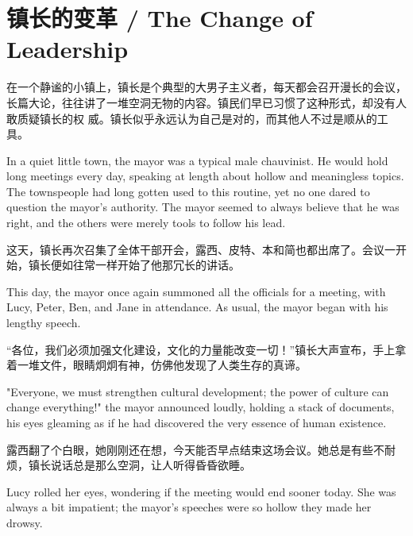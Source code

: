 \chapter*{镇长的变革 / The Change of Leadership}

在一个静谧的小镇上，镇长是个典型的大男子主义者，每天都会召开漫长的会议，长篇大论，往往讲了一堆空洞无物的内容。镇民们早已习惯了这种形式，却没有人敢质疑镇长的权
威。镇长似乎永远认为自己是对的，而其他人不过是顺从的工具。

\begin{flushright} In a quiet little town, the mayor was a typical male
    chauvinist. He would hold long meetings every day, speaking at length about
    hollow and meaningless topics. The townspeople had long gotten used to this
    routine, yet no one dared to question the mayor's authority. The mayor
    seemed
    to always believe that he was right, and the others were merely tools to
    follow
    his lead. \end{flushright}

这天，镇长再次召集了全体干部开会，露西、皮特、本和简也都出席了。会议一开始，镇长便如往常一样开始了他那冗长的讲话。

\begin{flushright} This day, the mayor once again summoned all the officials
    for a meeting, with Lucy, Peter, Ben, and Jane in attendance. As usual, the
    mayor began with his lengthy speech. \end{flushright}

“各位，我们必须加强文化建设，文化的力量能改变一切！”镇长大声宣布，手上拿着一堆文件，眼睛炯炯有神，仿佛他发现了人类生存的真谛。

\begin{flushright} "Everyone, we must strengthen cultural development; the
    power of culture can change everything!" the mayor announced loudly,
    holding a
    stack of documents, his eyes gleaming as if he had discovered the very
    essence
    of human existence. \end{flushright}

露西翻了个白眼，她刚刚还在想，今天能否早点结束这场会议。她总是有些不耐烦，镇长说话总是那么空洞，让人听得昏昏欲睡。

\begin{flushright} Lucy rolled her eyes, wondering if the meeting would end
    sooner today. She was always a bit impatient; the mayor's speeches were so
    hollow they made her drowsy. \end{flushright}

